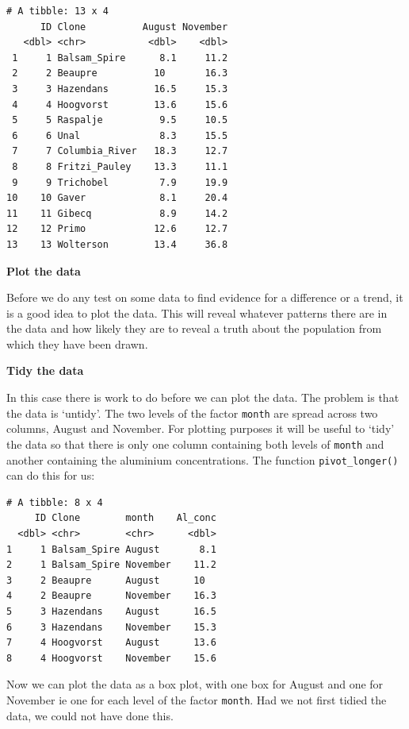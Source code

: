 \documentclass[
  letterpaper,
  DIV=11,
  numbers=noendperiod]{scrreprt}
\begin{document}
\begin{verbatim}
# A tibble: 13 x 4
      ID Clone          August November
   <dbl> <chr>           <dbl>    <dbl>
 1     1 Balsam_Spire      8.1     11.2
 2     2 Beaupre          10       16.3
 3     3 Hazendans        16.5     15.3
 4     4 Hoogvorst        13.6     15.6
 5     5 Raspalje          9.5     10.5
 6     6 Unal              8.3     15.5
 7     7 Columbia_River   18.3     12.7
 8     8 Fritzi_Pauley    13.3     11.1
 9     9 Trichobel         7.9     19.9
10    10 Gaver             8.1     20.4
11    11 Gibecq            8.9     14.2
12    12 Primo            12.6     12.7
13    13 Wolterson        13.4     36.8
\end{verbatim}

\textbf{Plot the data}

Before we do any test on some data to find evidence for a difference or
a trend, it is a good idea to plot the data. This will reveal whatever
patterns there are in the data and how likely they are to reveal a truth
about the population from which they have been drawn.

\textbf{Tidy the data}

In this case there is work to do before we can plot the data. The
problem is that the data is `untidy'. The two levels of the factor
\texttt{month} are spread across two columns, August and November. For
plotting purposes it will be useful to `tidy' the data so that there is
only one column containing both levels of \texttt{month} and another
containing the aluminium concentrations. The function
\texttt{pivot\_longer()} can do this for us:

\begin{verbatim}
# A tibble: 8 x 4
     ID Clone        month    Al_conc
  <dbl> <chr>        <chr>      <dbl>
1     1 Balsam_Spire August       8.1
2     1 Balsam_Spire November    11.2
3     2 Beaupre      August      10  
4     2 Beaupre      November    16.3
5     3 Hazendans    August      16.5
6     3 Hazendans    November    15.3
7     4 Hoogvorst    August      13.6
8     4 Hoogvorst    November    15.6
\end{verbatim}

Now we can plot the data as a box plot, with one box for August and one
for November ie one for each level of the factor \texttt{month}. Had we
not first tidied the data, we could not have done this.
\end{document}
